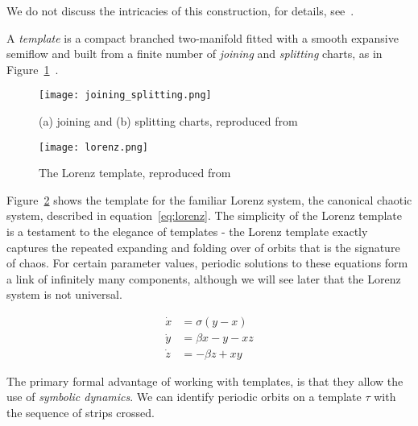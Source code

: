 \documentclass[paper.tex]{subfiles}
\begin{document}
We do not discuss the intricacies of this construction, for details, see~\cite{bw1983b}.


\begin{definition}[Template]
  A \emph{template} is a compact branched two-manifold fitted with a smooth expansive semiflow and built from a finite number of \emph{joining} and \emph{splitting} charts, as in Figure~\ref{fig:joinsplit}~\cite{knottyode}.\label{def:template}
\end{definition}


\begin{figure}[h]
  \centering
  \texttt{[image: joining\_splitting.png]}
  \caption[what goes here]{(a) joining and (b) splitting charts, reproduced from~\cite{knottyode}\protect\footnotemark}\label{fig:joinsplit}
\end{figure}






\begin{figure}[h]
  \centering
  \texttt{[image: lorenz.png]}
  \caption{The Lorenz template, reproduced from~\cite{knottyode}}\label{fig:lorenz}
\end{figure}

Figure~\ref{fig:lorenz} shows the template for the familiar Lorenz system, the canonical chaotic system, described in equation~\ref{eq:lorenz}. The simplicity of the Lorenz template is a testament to the elegance of
templates - the Lorenz template exactly captures the repeated expanding and folding over of orbits that is the signature of chaos. For certain parameter values, periodic solutions to these equations form a link of infinitely
many components, although we will see later that the Lorenz system is not universal.

\begin{align}
  \label{eq:lorenz}
  \dot{x} &= \sigma(y - x ) \\
  \dot{y} &= \beta x - y - x z \\
  \dot{z} &= - \beta z + x y
\end{align}

The primary formal advantage of working with templates, is that they allow the use of \emph{symbolic dynamics}. We can identify periodic orbits on a template $\tau$ with the sequence of strips crossed.
\end{document}
